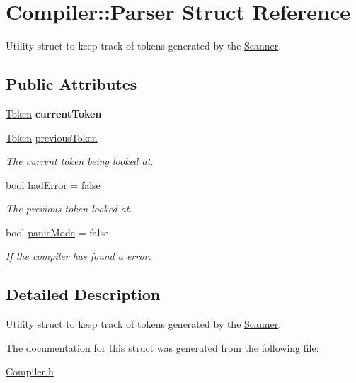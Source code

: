 \hypertarget{struct_compiler_1_1_parser}{}\section{Compiler\+:\+:Parser Struct Reference}
\label{struct_compiler_1_1_parser}


Utility struct to keep track of tokens generated by the \hyperlink{class_scanner}{Scanner}.  


\subsection*{Public Attributes}
\begin{DoxyCompactItemize}
\item 
\mbox{\label{struct_compiler_1_1_parser_a5142aa37ee164473435d59b4027ed970}} 
\hyperlink{struct_token}{Token} {\bfseries current\+Token}
\item 
\mbox{\label{struct_compiler_1_1_parser_a650279ddaef1e9ce7ca241e80a763050}} 
\hyperlink{struct_token}{Token} \hyperlink{struct_compiler_1_1_parser_a650279ddaef1e9ce7ca241e80a763050}{previous\+Token}
\begin{DoxyCompactList}\small\item\em The current token being looked at. \end{DoxyCompactList}\item 
\mbox{\label{struct_compiler_1_1_parser_ab49617160d485cbf8e672f013b119526}} 
bool \hyperlink{struct_compiler_1_1_parser_ab49617160d485cbf8e672f013b119526}{had\+Error} = false
\begin{DoxyCompactList}\small\item\em The previous token looked at. \end{DoxyCompactList}\item 
\mbox{\label{struct_compiler_1_1_parser_aa16626f4f3d02d7928ee4f1bb4134663}} 
bool \hyperlink{struct_compiler_1_1_parser_aa16626f4f3d02d7928ee4f1bb4134663}{panic\+Mode} = false
\begin{DoxyCompactList}\small\item\em If the compiler has found a error. \end{DoxyCompactList}\end{DoxyCompactItemize}


\subsection{Detailed Description}
Utility struct to keep track of tokens generated by the \hyperlink{class_scanner}{Scanner}. 

The documentation for this struct was generated from the following file\+:\begin{DoxyCompactItemize}
\item 
\hyperlink{_compiler_8h}{Compiler.\+h}\end{DoxyCompactItemize}
